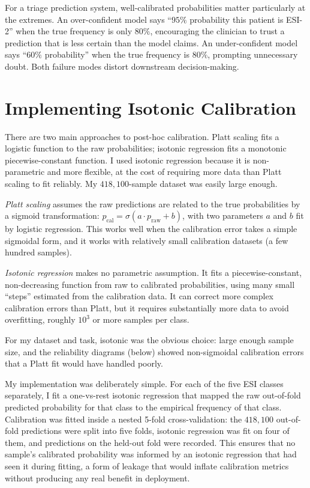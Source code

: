For a triage prediction system, well-calibrated probabilities matter particularly at the extremes. An over-confident model says ``$95\%$ probability this patient is ESI-2'' when the true frequency is only $80\%$, encouraging the clinician to trust a prediction that is less certain than the model claims. An under-confident model says ``$60\%$ probability'' when the true frequency is $80\%$, prompting unnecessary doubt. Both failure modes distort downstream decision-making.

\section{Implementing Isotonic Calibration}

There are two main approaches to post-hoc calibration. Platt scaling fits a logistic function to the raw probabilities; isotonic regression fits a monotonic piecewise-constant function. I used isotonic regression because it is non-parametric and more flexible, at the cost of requiring more data than Platt scaling to fit reliably. My $418{,}100$-sample dataset was easily large enough.

\begin{notebox}
\emph{Platt scaling} assumes the raw predictions are related to the true probabilities by a sigmoid transformation: $p_{\text{cal}} = \sigma(a \cdot p_{\text{raw}} + b)$, with two parameters $a$ and $b$ fit by logistic regression. This works well when the calibration error takes a simple sigmoidal form, and it works with relatively small calibration datasets (a few hundred samples).

\emph{Isotonic regression} makes no parametric assumption. It fits a piecewise-constant, non-decreasing function from raw to calibrated probabilities, using many small ``steps'' estimated from the calibration data. It can correct more complex calibration errors than Platt, but it requires substantially more data to avoid overfitting, roughly $10^3$ or more samples per class.

For my dataset and task, isotonic was the obvious choice: large enough sample size, and the reliability diagrams (below) showed non-sigmoidal calibration errors that a Platt fit would have handled poorly.
\end{notebox}

My implementation was deliberately simple. For each of the five ESI classes separately, I fit a one-vs-rest isotonic regression that mapped the raw out-of-fold predicted probability for that class to the empirical frequency of that class. Calibration was fitted inside a nested 5-fold cross-validation: the $418{,}100$ out-of-fold predictions were split into five folds, isotonic regression was fit on four of them, and predictions on the held-out fold were recorded. This ensures that no sample's calibrated probability was informed by an isotonic regression that had seen it during fitting, a form of leakage that would inflate calibration metrics without producing any real benefit in deployment.

